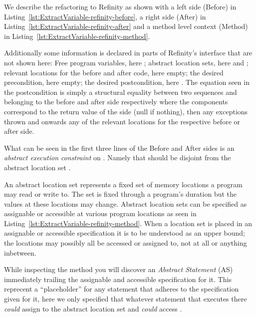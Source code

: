 We describe the refactoring to Refinity as shown with a left side (Before) in Listing~\ref{lst:ExtractVariable-refinity-before},
a right side (After) in Listing~\ref{lst:ExtractVariable-refinity-after} and a method level context (Method) in Listing~\ref{lst:ExtractVariable-refinity-method}.

Additionally some information is declared in parts of Refinity's interface that are not
shown here: Free program variables, here ; abstract location sets, here  and ; relevant locations for the before and after code, here empty;
the desired precondition, here empty; the desired postcondition, here .
The equation seen in the postcondition is simply a structural equality between two sequences  and  belonging to the before and after
side respectively where the components correspond to the return value of the side (null if nothing), then any exceptions thrown and onwards any of the relevant locations for
the respective  before or after side.

What can be seen in the first three lines of the Before and After sides is an \emph{abstract execution constraint} on .
Namely that  should be disjoint from the abstract location set .

An abstract location set represents a fixed set of memory locations a program may read or write to. The set is fixed through a program's duration but the values at these locations may change.
Abstract location sets can be specified as assignable or accessible at various program locations as seen in Listing~\ref{lst:ExtractVariable-refinity-method}.
When a location set is placed in an assignable or accessible specification it is to be understood as an upper bound; the locations may possibly all be accessed or assigned to, not at all or
anything inbetween.

While inspecting the method  you will discover an \emph{Abstract Statement} (AS)  immediately trailing the assignable and accessible specification for it.
This reprecent a ``placeholder'' for any statement that adheres to the specification given for it, here we only specified that whatever statement that executes there \emph{could} assign to the abstract
location set  and \emph{could} access .

